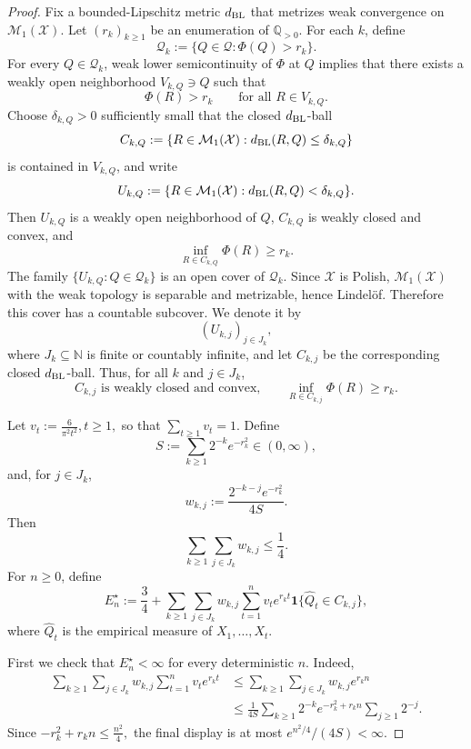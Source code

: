 \documentclass[11pt]{article}
\theoremstyle{definition}
\theoremstyle{definition}
\begin{document}
\begin{proof}
Fix a bounded-Lipschitz metric \(d_{\rm BL}\) that metrizes weak convergence on
\(\mathcal M_1(\mathcal X)\). Let \((r_k)_{k\ge1}\) be an enumeration of
\(\mathbb Q_{>0}\). For each \(k\), define
\[
  \mathcal Q_k:=\{Q\in\mathcal Q:\Phi(Q)>r_k\}.
\]
For every \(Q\in\mathcal Q_k\), weak lower semicontinuity of \(\Phi\) at \(Q\) implies that there
exists a weakly open neighborhood \(V_{k,Q}\ni Q\) such that
\[
  \Phi(R)>r_k
  \qquad\text{for all }R\in V_{k,Q}.
\]
Choose \(\delta_{k,Q}>0\) sufficiently small that the closed \(d_{\rm BL}\)-ball
\[
  C_{k,Q}:=\{R\in\mathcal M_1(\mathcal X):d_{\rm BL}(R,Q)\le \delta_{k,Q}\}
\]
is contained in \(V_{k,Q}\), and write
\[
  U_{k,Q}:=\{R\in\mathcal M_1(\mathcal X):d_{\rm BL}(R,Q)<\delta_{k,Q}\}.
\]
Then \(U_{k,Q}\) is a weakly open neighborhood of \(Q\), \(C_{k,Q}\) is weakly closed and convex,
and
\[
  \inf_{R\in C_{k,Q}}\Phi(R)\ge r_k.
\]
The family \(\{U_{k,Q}:Q\in\mathcal Q_k\}\) is an open cover of \(\mathcal Q_k\). Since
\(\mathcal X\) is Polish, \(\mathcal M_1(\mathcal X)\) with the weak topology is separable and
metrizable, hence Lindelöf. Therefore this cover has a countable subcover. We denote it by
\[
  (U_{k,j})_{j\in J_k},
\]
where \(J_k\subseteq\mathbb N\) is finite or countably infinite, and let \(C_{k,j}\) be the corresponding
closed \(d_{\rm BL}\)-ball. Thus, for all \(k\) and \(j\in J_k\),
\[
  C_{k,j}\text{ is weakly closed and convex,}
  \qquad
  \inf_{R\in C_{k,j}}\Phi(R)\ge r_k.
\]

Let
\(
  v_t:=\frac{6}{\pi^2t^2},
   t\ge1,
\)
so that \(\sum_{t\ge1}v_t=1\). Define
\[
  S:=\sum_{k\ge1}2^{-k}e^{-r_k^2}\in(0,\infty),
\]
and, for \(j\in J_k\),
\[
  w_{k,j}:=\frac{2^{-k-j}e^{-r_k^2}}{4S}.
\]
Then
\[
  \sum_{k\ge1}\sum_{j\in J_k} w_{k,j}\le \frac14.
\]
For \(n\ge0\), define
\[
  E^\star_n
  :=
  \frac34
  +
  \sum_{k\ge1}\sum_{j\in J_k}
  w_{k,j}\sum_{t=1}^n
  v_t e^{r_kt}\mathbf 1\{\widehat Q_t\in C_{k,j}\},
\]
where \(\widehat Q_t\) is the empirical measure of \(X_1,\ldots,X_t\).

First we check that \(E^\star_n<\infty\) for every deterministic \(n\). Indeed,
\[
\begin{aligned}
  \sum_{k\ge1}\sum_{j\in J_k}
  w_{k,j}\sum_{t=1}^n v_t e^{r_kt}
  &\le
  \sum_{k\ge1}\sum_{j\in J_k}
  w_{k,j} e^{r_kn}  \\
  &\le
  \frac1{4S}
  \sum_{k\ge1}2^{-k}e^{-r_k^2+r_kn}
  \sum_{j\ge1}2^{-j}.
\end{aligned}
\]
Since
\(
  -r_k^2+r_kn\le \frac{n^2}{4},
\)
the final display is at most \(e^{n^2/4}/(4S)<\infty\).


\end{proof}
\end{document}
